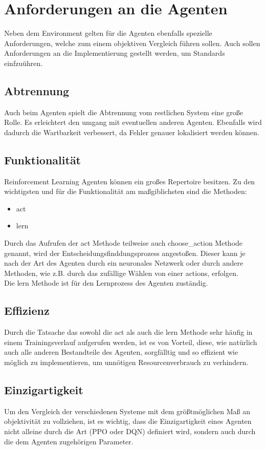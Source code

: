 \section{Anforderungen an die Agenten}
Neben dem Environment gelten für die Agenten ebenfalls spezielle Anforderungen, welche zum einem objektiven Vergleich führen sollen. Auch sollen Anforderungen an die Implementierung gestellt werden, um Standards einfzuühren.

\subsection{Abtrennung}
Auch beim Agenten spielt die Abtrennung vom restlichen System eine große Rolle. Es erleichtert den umgang mit eventuellen anderen Agenten.
Ebenfalls wird dadurch die Wartbarkeit verbessert, da Fehler genauer lokalisiert werden können.

\subsection{Funktionalität}
Reinforcement Learning Agenten können ein großes Repertoire besitzen. Zu den wichtigsten und für die Funktionalität am maßgiblichsten sind die Methoden:
\begin{itemize}
	\item act
	\item lern
\end{itemize}
Durch das Aufrufen der act Methode teilweise auch choose\_action Methode genannt, wird der Entscheidungsfinddungsprozess angestoßen. Dieser kann je nach der Art des Agenten durch ein neuronales Netzwerk oder durch andere Methoden, wie z.B. durch das zufällige Wählen von einer actions, erfolgen.\\
Die lern Methode ist für den Lernprozess des Agenten zuständig.

\subsection{Effizienz}
Durch die Tatsache das sowohl die act als auch die lern Methode sehr häufig in einem Trainingsverlauf aufgerufen werden, ist es von Vorteil, diese, wie natürlich auch alle anderen Bestandteile des Agenten, sorgfälltig und so effizient wie möglich zu implementieren, um unnötigen Resourcenverbrauch zu verhindern.

\subsection{Einzigartigkeit}
Um den Vergleich der verschiedenen Systeme mit dem größtmöglichen Maß an objektivität zu vollziehen, ist es wichtig, dass die Einzigartigkeit eines Agenten nicht alleine durch die Art (PPO oder DQN) definiert wird, sondern auch durch die dem Agenten zugehörigen Parameter.


